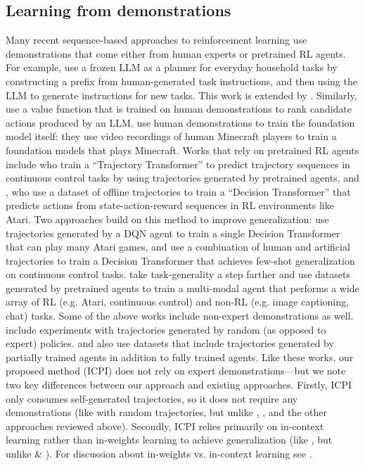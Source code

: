 \documentclass{article}
\begin{document}
\subsection{Learning from demonstrations}
Many recent sequence-based approaches to reinforcement learning use
demonstrations that come either from human experts or pretrained RL agents. For
example, \cite{huang_language_2022} use a frozen LLM as a planner for everyday
household tasks by constructing a prefix from human-generated task instructions,
and then using the LLM to generate instructions for new tasks. This work
is extended by \cite{huang_inner_2022}. Similarly,
\cite{ahn_as_2022} use a value function that is trained on human
demonstrations to rank candidate actions produced by an LLM.
\cite{baker_video_2022} use human demonstrations to train the foundation model
itself: they use video recordings of human Minecraft players to train a
foundation models that plays Minecraft. Works that rely on pretrained RL agents
include \cite{janner_offline_2021} who train a ``Trajectory Transformer'' to
predict trajectory sequences in continuous control tasks by using trajectories
generated by pretrained agents, and \cite{chen_decision_2021}, who use a
dataset of offline trajectories to train a ``Decision Transformer'' that
predicts actions from state-action-reward sequences in RL environments like
Atari. Two approaches build on this method to improve generalization:
\cite{lee_multi-game_2022} use trajectories generated by a DQN agent to train a
single Decision Transformer that can play many Atari games, and
\cite{xu_prompting_2022} use a combination of human and artificial trajectories
to train a Decision Transformer that achieves few-shot generalization on
continuous control tasks. \cite{reed_generalist_2022} take task-generality a
step farther and use datasets generated by pretrained agents to train a
multi-modal agent that performs a wide array of RL (e.g. Atari, continuous
control) and non-RL (e.g. image captioning, chat) tasks.
Some of the above works include non-expert demonstrations as well.
\cite{chen_decision_2021} include experiments with trajectories generated by
random (as opposed to expert) policies. \cite{lee_multi-game_2022} and
\cite{xu_prompting_2022} also use datasets that include trajectories generated
by partially trained agents in addition to fully trained agents. Like these
works, our proposed method (ICPI) does not rely on expert demonstrations---but
we note two key differences between our approach and existing approaches.
Firstly, ICPI only consumes self-generated trajectories, so it does not require
any demonstrations (like \cite{chen_decision_2021} with random trajectories,
but unlike \cite{lee_multi-game_2022}, \cite{xu_prompting_2022}, and the other
approaches reviewed above). Secondly, ICPI relies primarily on in-context
learning rather than in-weights learning to achieve generalization (like
\cite{xu_prompting_2022}, but unlike \cite{chen_decision_2021} \&
\cite{lee_multi-game_2022}). For discussion about in-weights vs. in-context
learning see \cite{chan_data_2022}.
\end{document}
